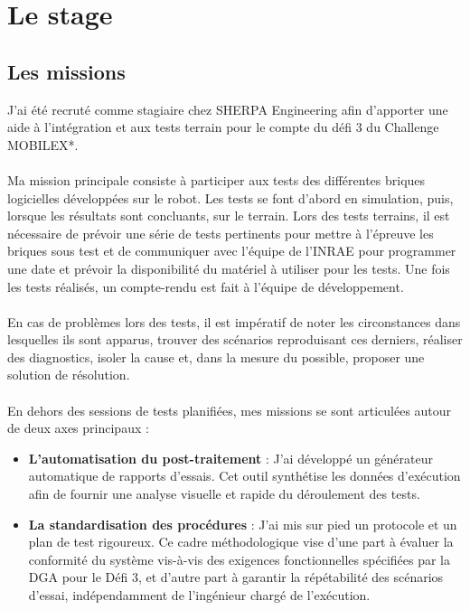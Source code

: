\section{Le stage}
\subsection{Les missions}
J'ai été recruté comme stagiaire chez SHERPA Engineering afin d'apporter une aide à l'intégration et aux tests terrain pour le compte du défi 3 du Challenge MOBILEX*.\\\\
\indent Ma mission principale consiste à participer aux tests des différentes briques logicielles développées sur le robot. Les tests se font d'abord en simulation, puis, lorsque les résultats sont concluants, sur le terrain. Lors des tests terrains, il est nécessaire de prévoir une série de tests pertinents pour mettre à l'épreuve les briques sous test et de communiquer avec l'équipe de l'INRAE pour programmer une date et prévoir la disponibilité du matériel à utiliser pour les tests. Une fois les tests réalisés, un compte-rendu est fait à l'équipe de développement.\\\\
\indent En cas de problèmes lors des tests, il est impératif de noter les circonstances dans lesquelles ils sont apparus, trouver des scénarios reproduisant ces derniers, réaliser des diagnostics, isoler la cause et, dans la mesure du possible, proposer une solution de résolution.\\\\
\indent En dehors des sessions de tests planifiées, mes missions se sont articulées autour de deux axes principaux : \\

\begin{itemize}
\renewcommand{\labelitemi}{$\bullet$}
    \item \textbf{L'automatisation du post-traitement} : J'ai développé un générateur automatique de rapports d'essais. Cet outil synthétise les données d'exécution afin de fournir une analyse visuelle et rapide du déroulement des tests.
    \item \textbf{La standardisation des procédures} : J'ai mis sur pied un protocole et un plan de test rigoureux. Ce cadre méthodologique vise d'une part à évaluer la conformité du système vis-à-vis des exigences fonctionnelles spécifiées par la DGA pour le Défi 3, et d'autre part à garantir la répétabilité des scénarios d'essai, indépendamment de l'ingénieur chargé de l'exécution.\\
\end{itemize}
    

